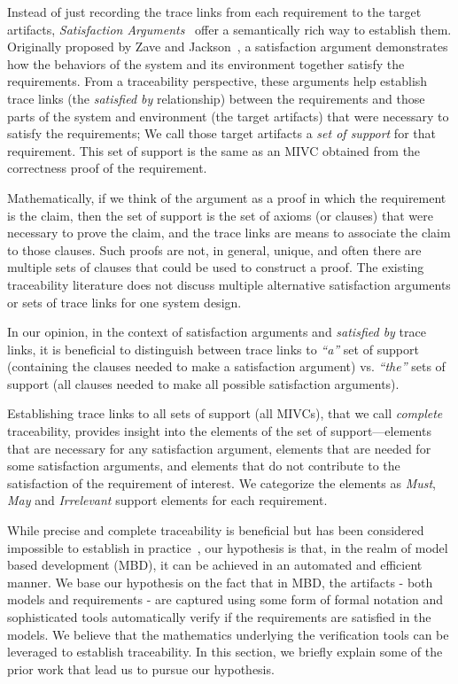 Instead of just recording the trace links from each requirement to the target artifacts, \emph{Satisfaction Arguments}~\cite{zave1997four} offer a semantically rich way to establish them. Originally proposed by Zave and Jackson~\cite{zave1997four}, a satisfaction argument demonstrates how the behaviors of the system and its environment together satisfy the requirements. From a traceability perspective, these arguments help establish
 trace links (the \emph{satisfied by} relationship) between the requirements and those parts of the system and environment (the target artifacts) that were necessary to satisfy the requirements; We call those target artifacts a \emph{set of support} for that requirement. This set of support is the same as an MIVC obtained from the correctness proof of the requirement.

 Mathematically, if we think of the argument as a proof in which the requirement is the claim, then the set of support is the set of axioms (or clauses) that were necessary to prove the claim, and the trace links are means to associate the claim to those clauses. Such proofs are not, in general, unique, and often there are multiple sets of clauses that could be used to construct a proof.  The existing traceability literature does not discuss multiple alternative satisfaction arguments or sets of trace links for one system design.

In our opinion, in the context of satisfaction arguments and {\em satisfied by} trace links, it is beneficial to distinguish between trace links to \textit{``a''} set of support (containing the clauses needed to make a satisfaction argument) vs. \textit{``the''} sets of support (all clauses needed to make all possible satisfaction arguments).


Establishing trace links to all sets of support (all MIVCs), that we call \emph{complete} traceability, provides insight into the elements of the set of support---elements that are necessary for any satisfaction argument, elements that are needed for some satisfaction arguments, and elements that do not contribute to the satisfaction of the requirement of interest.  We categorize the elements as \emph{Must}, \emph{May} and \emph{Irrelevant} support elements for each requirement.


While precise and complete traceability is beneficial but has been considered impossible to establish in practice~\cite{stravsunskas2002traceability}, our hypothesis is that, in the realm of model based development (MBD), it can be achieved in an automated and efficient manner. We base our hypothesis on the fact that in MBD, the artifacts - both models and requirements - are captured using some form of formal notation and sophisticated tools automatically verify if the requirements are satisfied in the models. We believe that the mathematics underlying the verification tools can be leveraged to establish traceability. In this section, we briefly explain some of the prior work that lead us to pursue our hypothesis.


